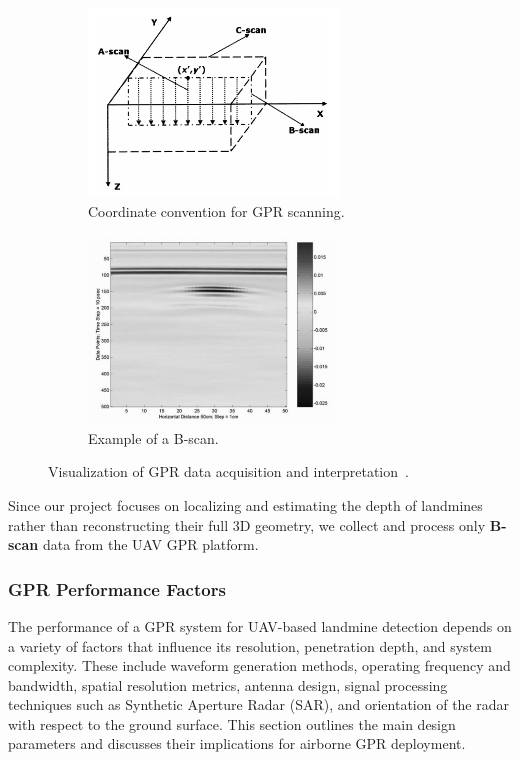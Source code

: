 \begin{figure}[h!]
    \centering
    \begin{subfigure}[b]{0.48\linewidth}
        \centering
        \includegraphics[height=5cm]{figs/Huirui/gpr_coords.png}
        \caption{Coordinate convention for GPR scanning.}
        \label{fig:gpr_coords}
    \end{subfigure}
    \hfill
    \begin{subfigure}[b]{0.48\linewidth}
        \centering
        \includegraphics[height=5cm]{figs/Huirui/gpr_bscan.png}
        \caption{Example of a B-scan.}
        \label{fig:gpr_bscan}
    \end{subfigure}
    \caption{Visualization of GPR data acquisition and interpretation~\cite{paik2002image}.}
\end{figure}

Since our project focuses on localizing and estimating the depth of landmines rather than reconstructing their full 3D geometry, we collect and process only \textbf{B-scan} data from the UAV GPR platform.




\subsubsection{GPR Performance Factors}

The performance of a GPR system for UAV-based landmine detection depends on a variety of factors that influence its resolution, penetration depth, and system complexity. These include waveform generation methods, operating frequency and bandwidth, spatial resolution metrics, antenna design, signal processing techniques such as Synthetic Aperture Radar (SAR), and orientation of the radar with respect to the ground surface. This section outlines the main design parameters and discusses their implications for airborne GPR deployment.


